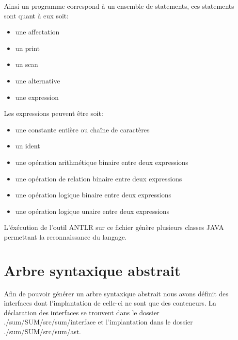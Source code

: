 \documentclass[a4paper,12pt]{report}
\begin{document}
Ainsi un programme correspond à un ensemble de statements, ces statements sont quant à eux soit:
\begin{itemize}
 \item une affectation
 \item un print
 \item un scan
 \item une alternative
 \item une expression
\end{itemize}
Les expressions peuvent être soit:
\begin{itemize}
 \item une constante entière ou chaîne de caractères
 \item un ident
 \item une opération arithmétique binaire entre deux expressions
 \item une opération de relation binaire entre deux expressions
 \item une opération logique binaire entre deux expressions
 \item une opération logique unaire entre deux expressions
\end{itemize}

L'éxécution de l'outil ANTLR sur ce fichier génère plusieurs classes JAVA permettant la reconnaissance du langage.

\section{Arbre syntaxique abstrait}
Afin de pouvoir générer un arbre syntaxique abstrait nous avons définit des interfaces dont l'implantation de celle-ci ne sont que
des conteneurs.
La déclaration des interfaces se trouvent dans le dossier ./sum/SUM/src/sum/interface et l'implantation dans le dossier
./sum/SUM/src/sum/ast.
\end{document}
